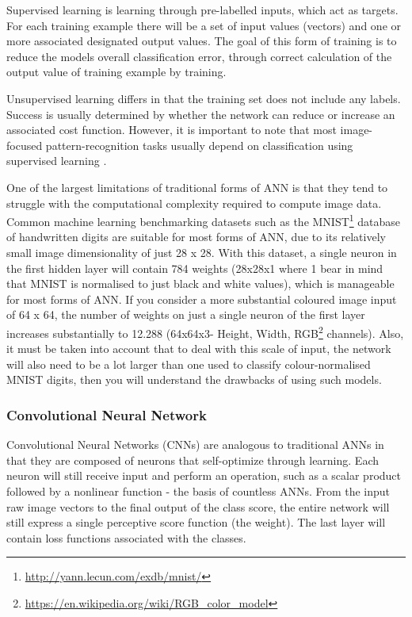Supervised learning is learning through pre-labelled inputs, which act as targets. For each training example there will be a set of input values (vectors) and one or more associated designated output values. The goal of this form of training is to reduce the models overall classification error, through correct calculation of the output value of training example by training.

Unsupervised learning differs in that the training set does not include any labels. Success is usually determined by whether the network can reduce or increase an associated cost function. However, it is important to note that most image-focused pattern-recognition tasks usually depend on classification using supervised learning \citep{cnn}.

One of the largest limitations of traditional forms of ANN is that they tend to struggle with the computational complexity required to compute image data. Common machine learning benchmarking datasets such as the MNIST\footnote{\href{http://yann.lecun.com/exdb/mnist/}{http://yann.lecun.com/exdb/mnist/}} database of handwritten digits are suitable for most forms of ANN, due to its relatively small image dimensionality of just 28 x 28. With this dataset, a single neuron in the first hidden layer will contain 784 weights (28x28x1 where 1 bear in mind that MNIST is normalised to just black and white values), which is manageable for most forms of ANN. If you consider a more substantial coloured image input of 64 x 64, the number of weights on just a single neuron of the first layer increases substantially to 12.288 (64x64x3- Height, Width, RGB\footnote{\href{https://en.wikipedia.org/wiki/RGB_color_model}{https://en.wikipedia.org/wiki/RGB\_color\_model}}
 channels). Also, it must be taken into account that to deal with this scale of input, the network will also need to be a lot larger than one used to classify colour-normalised MNIST digits, then you will understand the drawbacks of using such models.

\subsubsection{Convolutional Neural Network}

Convolutional Neural Networks (CNNs) are analogous to traditional ANNs in that they are composed of neurons that self-optimize through learning. Each neuron will still receive input and perform an operation, such as a scalar product followed by a nonlinear function - the basis of countless ANNs. From the input raw image vectors to the final output of the class score, the entire network will still express a single perceptive score function (the weight). The last layer will contain loss functions associated with the classes.

